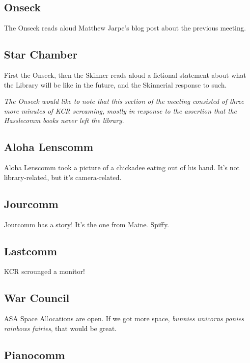 \documentclass[10pt]{article}
\begin{document}
\subsection*{Onseck}

The Onseck reads aloud Matthew Jarpe's blog post about the previous meeting.

\subsection*{Star Chamber}

First the Onseck, then the Skinner reads aloud a fictional statement about what the Library will be like in the future, and the Skinnerial response to such.

\emph{The Onseck would like to note that this section of the meeting consisted of three more minutes of KCR screaming, mostly in response to the assertion that the Hasslecomm books never left the library.}

\subsection*{Aloha Lenscomm}

Aloha Lenscomm took a picture of a chickadee eating out of his hand.  It's not library-related, but it's camera-related.

\subsection*{Jourcomm}

Jourcomm has a story!  It's the one from Maine.  Spiffy.

\subsection*{Lastcomm}

KCR scrounged a monitor!

\subsection*{War Council}

ASA Space Allocations are open.  If we got more space, \emph{bunnies unicorns ponies rainbows fairies}, that would be great.

\subsection*{Pianocomm}
\end{document}
